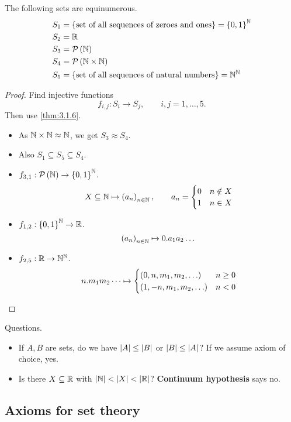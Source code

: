 \begin{example}
The following sets are equinumerous.
\begin{align*}
S_1 & = \left\{ \text{set of all sequences of zeroes and ones} \right\} = \left\{ 0, 1 \right\}^{\mathbb{N}} \\
S_2 & = \mathbb{R} \\
S_3 & = \mathcal{P}\left( \mathbb{N} \right) \\
S_4 & = \mathcal{P}\left( \mathbb{N} \times \mathbb{N} \right) \\
S_5 & = \left\{ \text{set of all sequences of natural numbers} \right\} = \mathbb{N}^{\mathbb{N}}
\end{align*}
\end{example}

\begin{proof}
Find injective functions
$$ f_{i, j} : S_i \to S_j, \qquad i, j = 1, \dots, 5. $$
Then use \ref{thm:3.1.6}.
\begin{itemize}
\item As $ \mathbb{N} \times \mathbb{N} \approx \mathbb{N} $, we get $ S_3 \approx S_4 $.
\item Also $ S_1 \subseteq S_5 \subseteq S_4 $.
\item $ f_{3, 1} : \mathcal{P}\left( \mathbb{N} \right) \to \left\{ 0, 1 \right\}^{\mathbb{N}} $.
$$ X \subseteq \mathbb{N} \mapsto \left( a_n \right)_{n \in \mathbb{N}}, \qquad a_n =
\begin{cases}
0 & n \notin X \\
1 & n \in X
\end{cases}
$$
\item $ f_{1, 2} : \left\{ 0, 1 \right\}^{\mathbb{N}} \to \mathbb{R} $.
$$ \left( a_n \right)_{n \in \mathbb{N}} \mapsto 0 . a_1a_2 \dots $$
\item $ f_{2, 5} : \mathbb{R} \to \mathbb{N}^{\mathbb{N}} $.
$$ n . m_1m_2 \dots \mapsto
\begin{cases}
\rb{0, n, m_1, m_2, \dots} & n \ge 0 \\
\rb{1, -n, m_1, m_2, \dots} & n < 0
\end{cases}
$$
\end{itemize}
\end{proof}

\pagebreak

Questions.
\begin{itemize}
\item If $ A, B $ are sets, do we have $ \left\lvert A \right\rvert \le \left\lvert B \right\rvert $ or $ \left\lvert B \right\rvert \le \left\lvert A \right\rvert $? If we assume axiom of choice, yes.
\item Is there $ X \subseteq \mathbb{R} $ with $ \left\lvert \mathbb{N} \right\rvert < \left\lvert X \right\rvert < \left\lvert \mathbb{R} \right\rvert $? \textbf{Continuum hypothesis} says no.
\end{itemize}

\subsection{Axioms for set theory}

